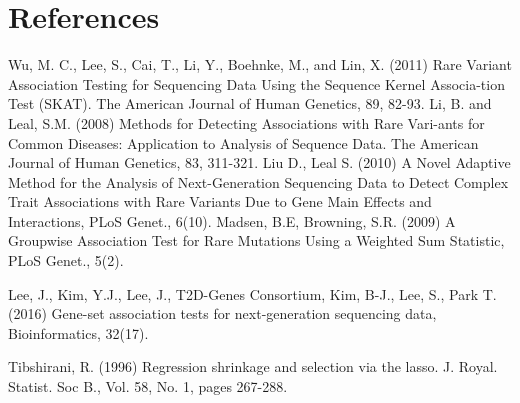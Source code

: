 \documentclass{article}
\begin{document}
\section{References}
\begin{thebibliography}{00}

 Wu, M. C., Lee, S., Cai, T., Li, Y., Boehnke, M., 
and Lin, X. (2011) 
Rare Variant Association Testing for Sequencing Data Using the Sequence 
Kernel Associa-tion Test (SKAT). The American Journal of 
Human Genetics, 89, 82-93.
 Li, B. and Leal, S.M. (2008) Methods for 
Detecting Associations 
with Rare Vari-ants for Common Diseases: Application to Analysis 
of Sequence Data. The American Journal of Human Genetics, 83, 311-321.
 Liu D., Leal S. (2010) A Novel Adaptive Method for 
the Analysis 
of Next-Generation Sequencing Data to Detect Complex Trait 
Associations with Rare Variants Due to Gene Main Effects and 
Interactions, PLoS Genet., 6(10).
 Madsen, B.E, Browning, S.R. (2009) 
A Groupwise Association 
Test for Rare Mutations Using a Weighted Sum Statistic, PLoS Genet., 5(2).

 Lee, J., Kim, Y.J., Lee, J., T2D-Genes Consortium, 
Kim, B-J., 
Lee, S., Park T. (2016) Gene-set association tests for 
next-generation sequencing data, Bioinformatics, 32(17).

 Tibshirani, R. (1996) Regression shrinkage 
and selection 
via the lasso. J. Royal. Statist. Soc B., Vol. 58, No. 1, pages 267-288.
\end{thebibliography}
\end{document}
